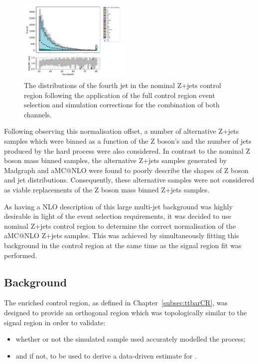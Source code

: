 \begin{figure}[tbp]
\centering
\includegraphics[width=0.47\textwidth]{figs/tzq-fullSelection-plots/plots_ee_zPlus/fourthJetPt.pdf}
\caption{
The distributions of the fourth jet \pt in the nominal Z+jets control region following the application of the full control region event selection and simulation corrections for the combination of both channels.
}
\label{fig:zPlusCR_fourthJetPt}
\end{figure}

Following observing this normalisation offset, a number of alternative Z+jets samples which were binned as a function of the Z boson's \pT and the number of jets produced by the hard process were also considered.
In contrast to the nominal Z boson mass binned samples, the alternative Z+jets samples generated by Madgraph and aMC@NLO were found to poorly describe the shapes of Z boson and jet distributions.
Consequently, these alternative samples were not considered as viable replacements of the Z boson mass binned Z+jets samples.

As having a NLO description of this large multi-jet background was highly desirable in light of the event selection requirements, it was decided to use nominal Z+jets control region to determine the correct normalisation of the aMC@NLO Z+jets samples.
This was achieved by simultaneously fitting this background in the control region at the same time as the signal region fit was performed.

\subsection{\ttbar Background}\label{subsec:ttbarEstimation}
The \ttbar enriched control region, as defined in Chapter~\ref{subsec:ttbarCR}, was designed to provide an orthogonal region which was topologically similar to the signal region in order to validate:
\begin{itemize}
\item whether or not the simulated \ttbar sample used accurately modelled the \ttbar process;
\item and if not, to be used to derive a data-driven estimate for \ttbar.
\end{itemize}

